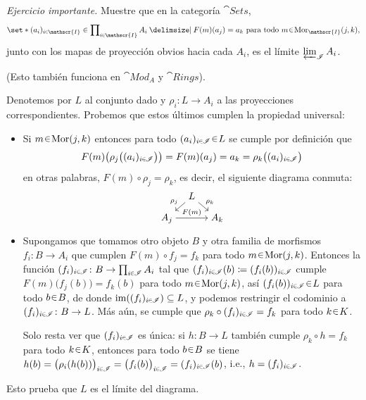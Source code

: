 \setcounter{neje}{1}
\begin{nejer}
\emph{Ejercicio importante.} Muestre que en la categoría $\cat{Sets}$,
$$
\set*{ (a_i)_{i\en\mathscr{I}} \in \prod\nolimits_{i\en\mathscr{I}} A_i \given F(m)(a_j) = a_k \text{ para todo } m \en \hom_{\mathscr{I}}(j, k) },
$$
junto con los mapas de proyección obvios hacia cada $A_i$, es el límite $\varprojlim_{\mathscr{I}} A_i$.\par
(Esto también funciona en $\cat{Mod}_A$ y $\cat{Rings}$).
\end{nejer}
\begin{sol}
Denotemos por $L$ al conjunto dado y $\rho_i \colon L \to A_i$ a las proyecciones correspondientes. Probemos que estos últimos cumplen la propiedad universal:
\begin{itemize}
\item 
Si $m\en\hom(j,k)$ entonces para todo $(a_i)_{i\en\mathscr{I}} \en L$ se cumple por definición que 
\[
F(m)\bigl(\rho_j\bigl((a_i)_{i\en\mathscr{I}}\bigr)\bigr)
= F(m)(a_j)
= a_k
= \rho_k\bigl((a_i)_{i\en\mathscr{I}}\bigr)
\]
en otras palabras, $F(m) \circ \rho_j = \rho_k$, es decir, el siguiente diagrama conmuta:
\[\begin{tikzcd}[cramped, ampersand replacement=\&, row sep = small, column sep = 1em]
	\& L \& \\
	{A_j} \&\& {A_k}
	\arrow["{\rho_j}"', from=1-2, to=2-1]
	\arrow["{\rho_k}", from=1-2, to=2-3]
	\arrow["{F(m)}", from=2-1, to=2-3]
\end{tikzcd}\]

\item 
Supongamos que tomamos otro objeto $B$ y otra familia de morfismos $f_i \colon B \to A_i$ que cumplen $F(m) \circ f_j = f_k$ para todo $m\en\hom(j,k)$. Entonces la función $(f_i)_{i\en\mathscr{I}} \colon B \to \prod_{i\en\mathscr{I}}A_i$ tal que $(f_i)_{i\en\mathscr{I}}(b) \coloneq (f_i(b))_{i\en\mathscr{I}}$ cumple $F(m)\bigl( f_j(b) \bigr) = f_k(b)$ para todo $m\en\hom(j,k)$, así $(f_i(b))_{i\en\mathscr{I}} \en L$ para todo $b\en B$, de donde $\im((f_i)_{i\en\mathscr{I}}) \subseteq L$, y podemos restringir el codominio a $(f_i)_{i\en\mathscr{I}} \colon B \to L$. Más aún, se cumple que $\rho_k \circ (f_i)_{i\en\mathscr{I}} = f_k$ para todo $k\en K$.\par 
Solo resta ver que $(f_i)_{i\en\mathscr{I}}$ es única: si $h \colon B \to L$ también cumple $\rho_k \circ h = f_k$ para todo $k\en K$, entonces para todo $b \en B$ se tiene $h(b) = \bigl(\rho_i(h(b))\bigr)_{i\en\mathscr{I}} = \bigl(f_i(b)\bigr)_{i \en\mathscr{I}} = (f_i)_{i\en\mathscr{I}}(b)$, i.e., $h = (f_i)_{i\en\mathscr{I}}$.
\end{itemize}
Esto prueba que $L$ es el límite del diagrama.
\end{sol}